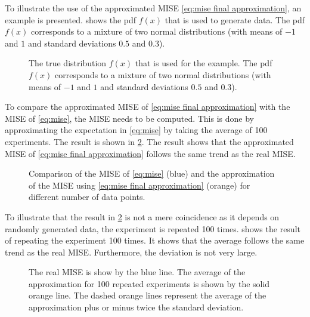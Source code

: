 \documentclass[10pt,final,a4paper,oneside,onecolumn]{article}
\newlength\figurewidth
\newlength\figureheight
\theoremstyle{plain}\newtheorem{definition}{Definition}[section]    %
\theoremstyle{definition}\newtheorem{example}{Example}[section]     %
\theoremstyle{remark}\newtheorem{remarkenv}{Remark}[section]        %
\begin{document}
To illustrate the use of the approximated MISE \cref{eq:mise final approximation}, an example is presented.  shows the pdf $f(x)$ that is used to generate data. The pdf $f(x)$ corresponds to a mixture of two normal distributions (with means of $-1$ and $1$ and standard deviations $0.5$ and $0.3$). 

\setlength{}
\setlength{}
\begin{figure}
	\centering
	
	\caption{The true distribution $f(x)$ that is used for the example. The pdf $f(x)$ corresponds to a mixture of two normal distributions (with means of $-1$ and $1$ and standard deviations $0.5$ and $0.3$). }
	\label{fig:pdf}
\end{figure}

To compare the approximated MISE of \cref{eq:mise final approximation} with the MISE of \cref{eq:mise}, the MISE needs to be computed. This is done by approximating the expectation in \cref{eq:mise} by taking the average of 100 experiments. The result is shown in \cref{fig:mise example}. The result shows that the approximated MISE of \cref{eq:mise final approximation} follows the same trend as the real MISE.

\setlength{}
\begin{figure}
	\centering
	
	\caption{Comparison of the MISE of \cref{eq:mise} (blue) and the approximation of the MISE using \cref{eq:mise final approximation} (orange) for different number of data points.}
	\label{fig:mise example}
\end{figure}

To illustrate that the result in \cref{fig:mise example} is not a mere coincidence as it depends on randomly generated data, the experiment is repeated 100 times.  shows the result of repeating the experiment 100 times. It shows that the average follows the same trend as the real MISE. Furthermore, the deviation is not very large.

\begin{figure}
	\centering
	
	\caption{The real MISE is show by the blue line. The average of the approximation for 100 repeated experiments is shown by the solid orange line. The dashed orange lines represent the average of the approximation plus or minus twice the standard deviation.}
	\label{fig:mise example repeats}
\end{figure}
\end{document}
